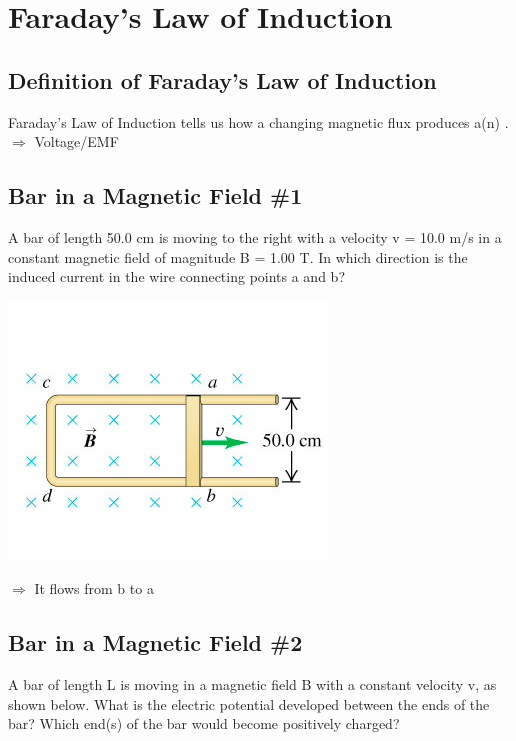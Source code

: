 \documentclass[11pt]{article}
\begin{document}


\pagebreak
\section{Faraday's Law of Induction}
\vspace{10pt}

\subsection{Definition of Faraday's Law of Induction}
Faraday's Law of Induction tells us how a changing magnetic flux produces a(n) \underline{\hspace{8mm}}.
$\Rightarrow$ Voltage/EMF


\subsection{Bar in a Magnetic Field \#1}
A bar of length 50.0 cm is moving to the right with a velocity v = 10.0 m/s in a constant magnetic field of magnitude B = 1.00 T.  In which direction is the induced current in the wire connecting points a and b?

\begin{center}
\includegraphics[scale=0.5]{Images/bar_and_rails.png}
\end{center}

$\Rightarrow$ It flows from b to a

\subsection{Bar in a Magnetic Field \#2}
A bar of length L is moving in a magnetic field B with a constant velocity v, as shown below.  What is the electric potential developed between the ends of the bar?  Which end(s) of the bar would become positively charged?
\end{document}

